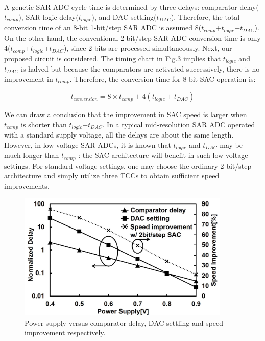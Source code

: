 A genetic SAR ADC cycle time is determined by three delays: comparator delay($t_{comp}$), SAR logic delay($t_{logic}$), and DAC settling($t_{DAC}$). Therefore, the total conversion time of an 8-bit 1-bit/step SAR ADC is assumed 8($t_{comp}$+$t_{logic}$+$t_{DAC}$). On the other hand, the conventional 2-bit/step SAR ADC conversion time is only 4($t_{comp}$+$t_{logic}$+$t_{DAC}$), since 2-bits are processed simultaneously. Next, our proposed circuit is considered. The timing chart in Fig.3 implies that $t_{logic}$ and $t_{DAC}$ is halved but because the comparators are activated successively, there is no improvement in $t_{comp}$. Therefore, the conversion time for 8-bit SAC operation is: 

\begin{equation}
    t_{conversion} = 8 \times t_{comp}+4(t_{logic}+t_{DAC})
\end{equation}

We can draw a conclusion that the improvement in SAC speed is larger when $t_{comp}$ is shorter than $t_{logic}$+$t_{DAC}$. In a typical mid-resolution SAR ADC operated with a standard supply voltage, all the delays are about the same length. However, in low-voltage SAR ADCs, it is known that $t_{logic}$ and $t_{DAC}$ may be much longer than $t_{comp}$ \cite{sekimoto201140nm}: the SAC architecture will benefit in such low-voltage settings. For standard voltage settings, one may choose the ordinary 2-bit/step architecture and simply utilize three TCCs to obtain sufficient speed improvements.

\begin{figure}
\centering
  \includegraphics[width=0.9\textwidth]{figure/chap4/fig4.jpg}
  \caption{Power supply versus comparator delay, DAC settling and speed improvement respectively.}
  \label{fig-4-4}
\end{figure}

